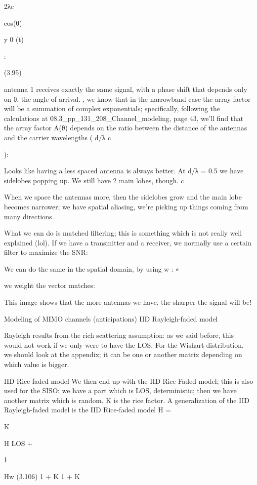 {{{{2\pid λc

cos(θ)

y 0 (t)

:

(3.95)

antenna 1 receives exactly the same signal, with a phase shift that depends only on θ,
the angle of arrival.
, we know that in the narrowband case the array factor will be a summation of complex exponentials;
specifically,
following the calculations at 08.3_pp_131_208_Channel_modeling, page 43, we'll find that the array factor A(θ)
depends on the ratio between the distance of the antennas and the carrier wavelengths (
d/λ c

):

Looks like having a less spaced antenna is always better.
At d/λ = 0.5 we have sidelobes popping up. We still have 2 main lobes, though.
c

When we space the antennas more, then the sidelobes grow and the main lobe becomes narrower; we have spatial aliasing, we're picking up things coming from many directions.

What we can do is matched filtering; this is something which is not really well explained
(lol). If we have a transmitter and a receiver, we normally use a certain filter to maximize the SNR:

We can do the same in the spatial domain, by using w :
∗

we weight the vector matches:

This image shows that the more antennas we have, the sharper the signal will be!

Modeling of MIMO channels (anticipations)
IID Rayleigh-faded model

Rayleigh results from the rich scattering assumption: as we said before, this would not work if we only were to have the LOS.
For the Wishart distribution, we should look at the appendix; it can be one or another matrix depending on which value is bigger.

IID Rice-faded model We then end up with the IID Rice-Faded model; this is also used for the SISO: we have a part which is LOS, deterministic; then we have another matrix which is random. K is the rice factor.
A generalization of the IID Rayleigh-faded model is the IID Rice-faded model H = \sqrt

K

H LOS + \sqrt

1

Hw
(3.106)
1 + K 1 + K





\muH

}}}}
